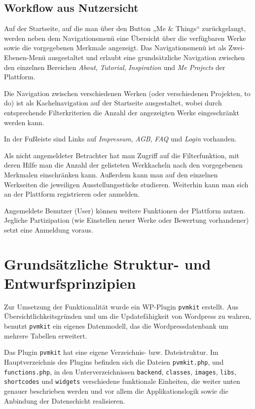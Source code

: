 \documentclass[a4paper,11pt]{article}
\begin{document}
\subsection{Workflow aus Nutzersicht}

Auf der Startseite, auf die man über den Button „Me \& Things“ zurückgelangt,
werden neben dem Navigationsmenü eine Übersicht über die verfügbaren Werke
sowie die vorgegebenen Merkmale angezeigt. Das Navigationsmenü ist als
Zwei-Ebenen-Menü ausgestaltet und erlaubt eine grundsätzliche Navigation
zwischen den einzelnen Bereichen \emph{About}, \emph{Tutorial},
\emph{Inspiration} und \emph{Me Projects} der Plattform.

Die Navigation zwischen verschiedenen Werken (oder verschiedenen Projekten, to
do) ist als Kachelnavigation auf der Startseite ausgestaltet, wobei durch
entsprechende Filterkriterien die Anzahl der angezeigten Werke eingeschränkt
werden kann.

In der Fußleiste sind Links auf \emph{Impressum}, \emph{AGB}, \emph{FAQ} und
\emph{Login} vorhanden.  

Als nicht angemeldeter Betrachter hat man Zugriff auf die Filterfunktion, mit
deren Hilfe man die Anzahl der gelisteten Werkkacheln nach den vorgegebenen
Merkmalen einschränken kann. Außerdem kann man auf den einzelnen Werkseiten
die jeweiligen Ausstellungsstücke studieren. Weiterhin kann man sich an der
Plattform registrieren oder anmelden.
 
Angemeldete Benutzer (User) können weitere Funktionen der Plattform nutzen.
Jegliche Partizipation (wie Einstellen neuer Werke oder Bewertung vorhandener)
setzt eine Anmeldung voraus.

\section{Grundsätzliche Struktur- und Entwurfsprinzipien}
 
Zur Umsetzung der Funktionalität wurde ein WP-Plugin \texttt{pvmkit} erstellt.
Aus Übersichtlichkeitsgründen und um die Updatefähigkeit von Wordpress zu
wahren, benutzt \texttt{pvmkit} ein eigenes Datenmodell, das die
Wordpressdatenbank um mehrere Tabellen erweitert.  
 
Das Plugin \texttt{pvmkit} hat eine eigene Verzeichnis- bzw. Dateistruktur. Im
Hauptverzeichnis des Plugins befinden sich die Dateien \texttt{pvmkit.php}, und
\texttt{functions.php}, in den Unterverzeichnissen \texttt{backend},
\texttt{classes}, \texttt{images}, \texttt{libs}, \texttt{shortcodes} und
\texttt{widgets} verschiedene funktionale Einheiten, die weiter unten genauer
beschrieben werden und vor allem die Applikationslogik sowie die Anbindung der
Datenschicht realisieren.
\end{document}
